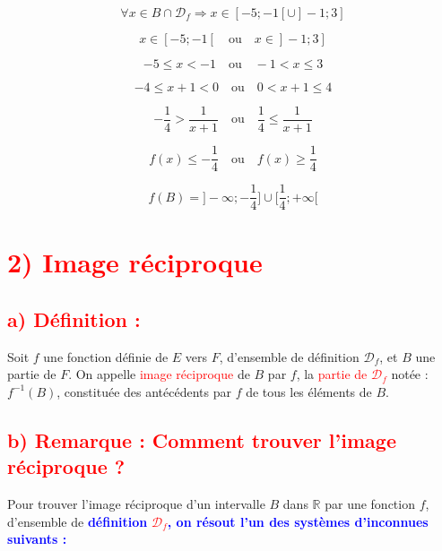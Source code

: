 \documentclass[a4paper,12pt]{article}
\begin{document}
\[
\forall x \in B \cap \mathcal{D}_f \Rightarrow x \in [-5; -1[ \cup ]-1; 3]
\]

\[
x \in [-5; -1[ \quad \text{ou} \quad x \in ]-1; 3]
\]

\[
-5 \leq x < -1 \quad \text{ou} \quad -1 < x \leq 3
\]

\[
-4 \leq x+1 < 0 \quad \text{ou} \quad 0 < x+1 \leq 4
\]

\[
-\frac{1}{4} > \frac{1}{x+1} \quad \text{ou} \quad \frac{1}{4} \leq \frac{1}{x+1}
\]

\[
f(x) \leq -\frac{1}{4} \quad \text{ou} \quad f(x) \geq \frac{1}{4}
\]

\[
f(B) = ]-\infty; -\frac{1}{4}] \cup [\frac{1}{4}; +\infty[
\]
\section*{\textcolor{red}{2) Image réciproque}}

\subsection*{\textcolor{red}{a) Définition :}}
Soit \( f \) une fonction définie de \( E \) vers \( F \), d'ensemble de définition \( \mathcal{D}_f \), et \( B \) une partie de \( F \). On appelle \textcolor{red}{image réciproque} de \( B \) par \( f \), la \textcolor{red}{partie de \( \mathcal{D}_f \)} notée : \( f^{-1}(B) \), constituée des antécédents par \( f \) de tous les éléments de \( B \).

\subsection*{\textcolor{red}{b) Remarque : Comment trouver l'image réciproque ?}}
Pour trouver l'image réciproque d'un intervalle \( B \) dans \( \mathbb{R} \) par une fonction \( f \), d'ensemble de \noindent \textbf{\textcolor{blue}{définition}} \textcolor{red}{\( \mathcal{D}_f \)}\textbf{\textcolor{blue}{, on résout l’un des systèmes d’inconnues suivants :}}
\end{document}
